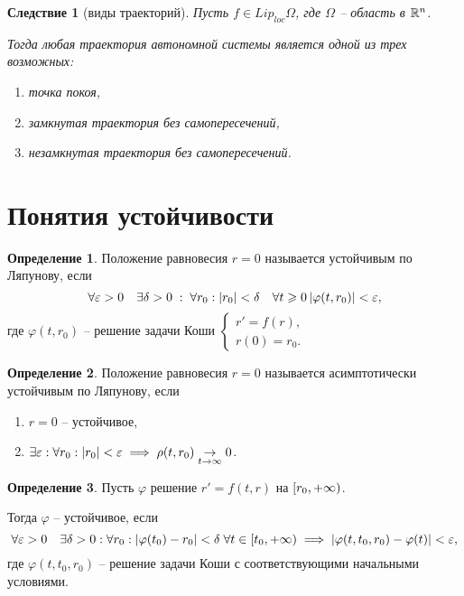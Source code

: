 \documentclass[a5paper, 10pt]{article}
\theoremstyle{definition}
\newtheorem{Def}{Определение}
\theoremstyle{plain}
\newtheorem{Cor}{Следствие}
\theoremstyle{remark}
\begin{document}
\begin{Cor}[виды траекторий]
	Пусть $f\in Lip_{loc} \Omega$, где $\Omega$ -- область в $\mathbb{R}^n$. 
	
	Тогда любая траектория автономной системы является одной из трех возможных:
	\begin{enumerate}
		\item точка покоя,
		\item замкнутая траектория без самопересечений,
		\item незамкнутая траектория без самопересечений.
	\end{enumerate}
\end{Cor}

	\section{Понятия устойчивости}
		\begin{Def}
			Положение равновесия $r=0$ называется устойчивым по Ляпунову, если 
			\[
			\forall \varepsilon >0 \quad \exists \delta >0 \;:\; \forall r_0: \left|r_0\right|<\delta \quad  \forall t \geqslant 0 \left|\varphi(t,r_0)\right|<\varepsilon,
			\]
			где $\varphi(t,r_0)$ -- решение задачи Коши $\begin{cases}
				r'=f(r),\\r(0) = r_0.
			\end{cases}$
		\end{Def}
		\begin{Def}
			Положение равновесия $r=0$ называется асимптотически устойчивым по Ляпунову, если 
			\begin{enumerate}
				\item $r=0$ -- устойчивое,
				\item $\exists \varepsilon : \forall r_0: \left|r_0\right|<\varepsilon \implies  \rho(t,r_0) \underset{t\rightarrow \infty}{\rightarrow} 0$.
			\end{enumerate}
		\end{Def}
		\begin{Def}
			Пусть $\varphi$ решение $r'=f(t,r)$ на $\left[r_0,+\infty\right)$. 
			
			Тогда $\varphi$ -- устойчивое, если
			\[
			\forall \varepsilon >0 \quad \exists \delta >0 : \forall r_0: \left|\varphi(t_0) - r_0\right|<\delta  \; \forall t\in \left[t_0, +\infty\right) \implies \left|\varphi(t,t_0, r_0) - \varphi(t)\right|<\varepsilon,
			\]
			где  $\varphi(t,t_0, r_0)$ -- решение задачи Коши с соответствующими начальными условиями.
		\end{Def}
\end{document}
